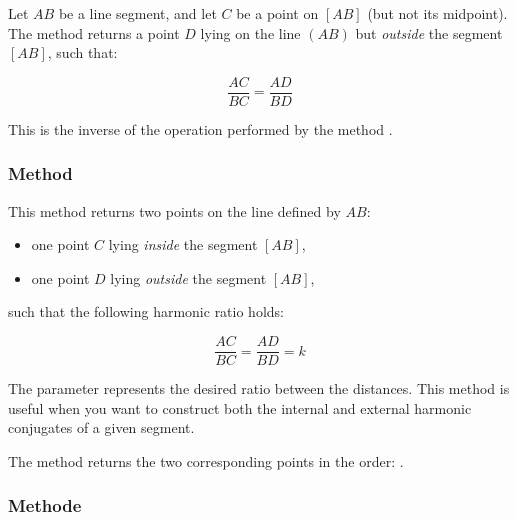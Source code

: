 \medskip
\noindent
Let $AB$ be a line segment, and let $C$ be a point on $[AB]$ (but not its midpoint). The method returns a point $D$ lying on the line $(AB)$ but \emph{outside} the segment $[AB]$, such that:

\[
\frac{AC}{BC} = \frac{AD}{BD}
\]

\noindent
This is the inverse of the operation performed by the method .

\subsubsection{Method }
\label{ssub:harmonic_both}

This method returns two points on the line defined by $AB$:

\begin{itemize}
  \item one point $C$ lying \emph{inside} the segment $[AB]$,
  \item one point $D$ lying \emph{outside} the segment $[AB]$,
\end{itemize}

\noindent such that the following harmonic ratio holds:

\[
\frac{AC}{BC} = \frac{AD}{BD} = k
\]

\noindent
The parameter  represents the desired ratio between the distances. This method is useful when you want to construct both the internal and external harmonic conjugates of a given segment.

\medskip
\noindent
The method returns the two corresponding points in the order: .

\vspace{2em}
\begin{tkzexample}
\begin{center}
\end{center}

\end{tkzexample}

\subsubsection{Methode }
\label{ssub:methode_imeth_line_gold__ratio}


